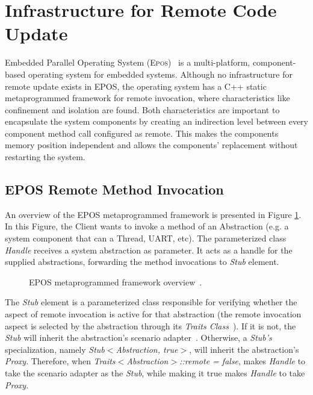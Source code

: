 \documentclass[10pt]{sigplanconf}
\newcommand{\epos}{\textsc{Epos}}
\newcommand{\proxy}{\textit{Proxy}}
\newcommand{\fig}[4][tb]{
  \begin{figure}[#1] {\centering{\texttt{[image: figures/\#2]}}\par}
    \caption{#3\label{fig:#2}}
  \end{figure}
}
\begin{document}
\section{Infrastructure for Remote Code Update}

Embedded Parallel Operating System (\epos{})~\cite{Froehlich:2001} is a multi-platform, component-based operating system for embedded systems. Although no infrastructure for remote update exists in EPOS, the operating system has a C++ static metaprogrammed framework for remote invocation, where characteristics like confinement and isolation are found. Both characteristics are important to encapsulate the system components by creating an indirection level between every component method call configured as remote. This makes the components memory position independent and allows the components' replacement without restarting the system.

\subsection{EPOS Remote Method Invocation}

An overview of the EPOS metaprogrammed framework is presented in Figure \ref{fig:framework.pdf}. In this Figure, the Client wants to invoke a method of an Abstraction (e.g. a system component that can a Thread, UART, etc). The parameterized class \textit{Handle} receives a system abstraction as parameter. It acts as a handle for the supplied abstractions, forwarding the method invocations to \textit{Stub} element. %

\fig{framework.pdf}{EPOS metaprogrammed framework overview~\cite{Froehlich:2001}.}{width=6cm}

The \textit{Stub} element is a parameterized class responsible for verifying whether the aspect of remote invocation is active for that abstraction (the remote invocation aspect is selected by the abstraction through its \textit{Traits Class}~\cite{Stroustrup:1997}). If it is not, the \textit{Stub} will inherit the abstraction's scenario adapter~\cite{Froehlich:sci:2000}. Otherwise, a \textit{Stub's} specialization, namely \textit{Stub$<$Abstraction, true$>$}, will inherit the abstraction's \proxy{}. Therefore, when \textit{Traits$<$Abstraction$>$::remote = false}, makes \textit{Handle} to take the scenario adapter as the \textit{Stub}, while making it true makes \textit{Handle} to take \proxy{}.
\end{document}
